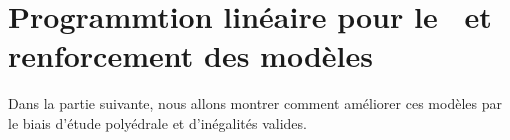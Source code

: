 \chapter{Programmtion linéaire pour le \CECSP~et renforcement des modèles}







Dans la partie suivante, nous allons montrer comment améliorer ces
modèles par le biais d'étude polyédrale et d'inégalités valides.




